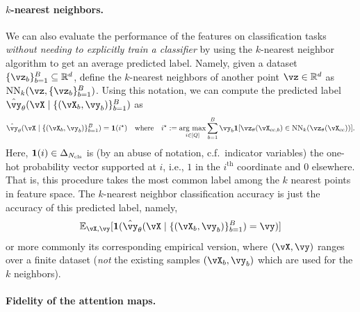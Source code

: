 \documentclass[../../book-main.tex]{subfiles}
\begin{document}
\paragraph{\(k\)-nearest neighbors.}  We can also evaluate the performance of the features on classification tasks \textit{without needing to explicitly train a classifier} by using the \(k\)-nearest neighbor algorithm to get an average predicted label. Namely, given a dataset \(\{\vz_{b}\}_{b = 1}^{B} \subseteq \R^{d}\), define the \(k\)-nearest neighbors of another point \(\vz \in \R^{d}\) as \(\operatorname{NN}_{k}(\vz, \{\vz_{b}\}_{b = 1}^{B})\). Using this notation, we can compute the predicted label \(\hat{\vy}_{\theta}(\vX \mid \{(\vX_{b}, \vy_{b})\}_{b = 1}^{B})\) as 
\begin{equation}
    \hat{\vy}_{\theta}(\vX \mid \{(\vX_{b}, \vy_{b})\}_{b = 1}^{B}) = \vone(i^{\star}) \quad \text{where} \quad i^{\star} := \argmax_{i \in [Q]}\sum_{b = 1}^{B}\vy_{b}\indvar[\vz_{\theta}(\vX_{\cc, b}) \in \operatorname{NN}_{k}(\vz_{\theta}(\vX_{\cc}))].
\end{equation}
Here, \(\bm{1}(i) \in \Delta_{N_{\mathrm{cls}}}\) is (by an abuse of notation, c.f.~indicator variables) the one-hot probability vector supported at \(i\), i.e., \(1\) in the \(i^{\mathrm{th}}\) coordinate and \(0\) elsewhere. That is, this procedure takes the most common label among the \(k\) nearest points in feature space. The \(k\)-nearest neighbor classification accuracy is just the accuracy of this predicted label, namely,
\begin{equation}
    \Ex_{\vX, \vy}[\indvar(\hat{\vy}_{\theta}(\vX \mid \{(\vX_{b}, \vy_{b})\}_{b = 1}^{B}) = \vy)]
\end{equation}
or more commonly its corresponding empirical version, where \((\vX, \vy)\) ranges over a finite dataset (\textit{not} the existing samples \((\vX_{b}, \vy_{b})\) which are used for the \(k\) neighbors).

\paragraph{Fidelity of the attention maps.}
\end{document}
